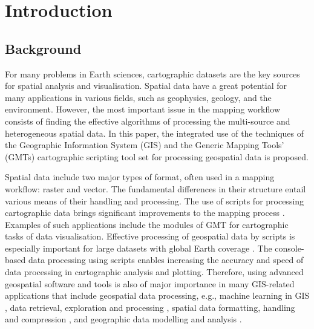 \documentclass[data,article,accept,pdftex,moreauthors]{Definitions/mdpi}
\begin{document}

\section{Introduction}

\subsection{Background}

For many problems in Earth sciences, cartographic datasets are the key sources for spatial analysis {and} visualisation. {Spatial data have a great potential for many applications in various fields, such as geophysics, geology, and the environment}. However, the most important issue{ }in the mapping workflow consists of finding the {effective} algorithms of{ }processing {the} multi-source and heterogeneous {spatial} data. {In this} paper{,} the {integrated }use of the techniques of the Geographic Information System (GIS) and the Generic Mapping Tools' (GMTs) cartographic scripting tool set for processing geospatial{ }data {is proposed}.

{Spatial} data {include} two major{ types of} format{, often used} in a mapping workflow: raster and vector. {The }fundamental differences in {their} structure entail various means of {their }handling and processing{. The use of scripts for processing} cartographic data {brings} significant{ }improvements to the mapping process \cite{CHEN2022105362,ORTOLANO201856, Lemenkova202203,OMRAN2016140,data5010008}. Examples of such applications include {the} modules of GMT for {cartographic} tasks of data {visualisation}. Effective processing of geospatial data by scripts is especially important for large datasets with global {Earth} coverage \cite{LEI2020202,XIA2018245,NATIVI20151,WAGEMANN2021104916}. The console-based data processing using scripts enables increasing the accuracy and speed of data processing in cartographic analysis and plotting. Therefore, using advanced geospatial software and tools is also of major importance in many GIS-related applications that include geospatial data processing, {e.g.,} machine learning {in} GIS \cite{Mori,1607434,ARABAMERI2021100848,ZUO2021105111,SUN201926}, data retrieval, exploration and processing \cite{BUCK2022121,Lemenkova202135,1369823}, spatial data formatting, handling and compression \cite{ZHU2022104166,data4030118,data6080081,DEMIRALTINTAS2021103743}, and geographic data modelling and analysis \cite{MA2021103858,Lemenkova202205,TAMIMINIA2020152}. 
\end{document}
